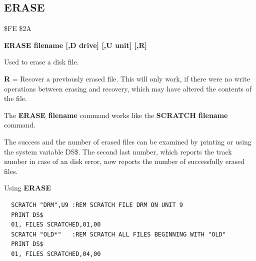 
\newpage
\subsection{ERASE}
\begin{description}[leftmargin=2cm,style=nextline]
\item [Token:] \$FE \$2A
\item [Format:] {\bf ERASE filename [,D drive] [,U unit] [,R]}
\item [Usage:] Used
               to erase a disk file.

   \filenamedefinition

   \drivedefinition

   \unitdefinition

   {\bf R} = Recover a previously erased file.
   This will only work, if there were no write operations
   between erasing and recovery, which may have altered the
   contents of the file.

\item [Remarks:] The {\bf ERASE filename} command works like the
                 {\bf SCRATCH filename} command.

                 The success and the number of erased files can
                 be examined by printing or using the system
                 variable DS\$. The second last number, which
                 reports the track number in case of an disk error,
                 now reports the number of successfully erased files.

\item [Example:] Using {\bf ERASE}
\begin{tcolorbox}[colback=black,coltext=white]
\verbatimfont{\codefont}
\begin{verbatim}
  SCRATCH "DRM",U9 :REM SCRATCH FILE DRM ON UNIT 9
  PRINT DS$
  01, FILES SCRATCHED,01,00
  SCRATCH "OLD*"   :REM SCRATCH ALL FILES BEGINNING WITH "OLD"
  PRINT DS$
  01, FILES SCRATCHED,04,00
\end{verbatim}
\end{tcolorbox}
\end{description}


\newpage
